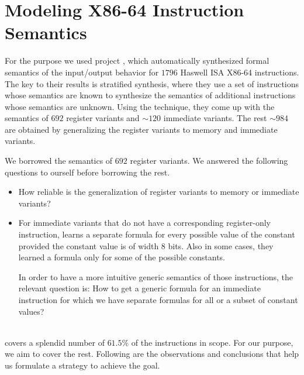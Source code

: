 \section{Modeling X86-64 Instruction Semantics}

For the purpose we used project \Strata, which automatically synthesized formal semantics  of the input/output behavior for $1796$ Haswell ISA X86-64 instructions. The key to their results is stratified synthesis, where they use a set of instructions whose semantics are known to synthesize the semantics of additional instructions whose semantics are unknown. Using the technique, they 
come up with the semantics of $692$ register variants and $\sim120$ immediate variants. The rest $\sim984$ are obtained by generalizing the register variants to memory and immediate variants.     

We borrowed the semantics of $692$ register variants. We answered the following questions to ourself before borrowing the rest.   

\begin{itemize}
    \item How reliable is the generalization of register variants to memory or immediate variants?   
    
    \item  For immediate  variants that do not have a corresponding register-only instruction, \Strata  learns a separate formula for every possible value of the constant provided the constant value is of width 8 bits. Also in some cases, they learned a formula only for some of the possible constants.
    
    In order to have a more intuitive generic semantics of those instructions, the relevant question is: How to get a generic formula for an immediate instruction for which we have separate formulas for all or a subset of constant values?   
\end{itemize} 
\ \\
\Strata covers a splendid number of $61.5\%$ of the instructions in scope. For our purpose, we aim to cover the rest. Following are the observations and conclusions that help us formulate a strategy to achieve the goal.

